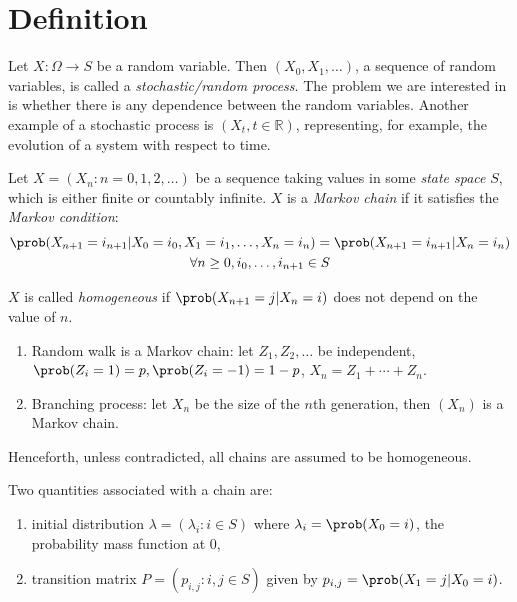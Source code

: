 \documentclass[a4paper]{article}
\begin{document}


\tableofcontents

\section{Definition}

Let $X:\Omega \to S$ be a random variable. Then $(X_0,X_1, \ldots)$, a sequence of random variables, is called a \emph{stochastic/random process}. The problem we are interested in is whether there is any dependence between the random variables. Another example of a stochastic process is $(X_t, t \in \mathbb{R})$, representing, for example, the evolution of a system with respect to time.

\begin{definition}
  Let $X=(X_n:n=0,1,2,\ldots)$ be a sequence taking values in some \emph{state space} $S$, which is either finite or countably infinite. $X$ is a \emph{Markov chain} if it satisfies the \emph{Markov condition}:
  \begin{multline*}
    \prob(X_{n+1}=i_{n+1}|X_0=i_0,X_1=i_1,\ldots,X_n=i_n) = \prob(X_{n+1}=i_{n+1}|X_n=i_n) \\
    \forall n\geq0, i_0,\ldots,i_{n+1}\in S
  \end{multline*}

  $X$ is called \emph{homogeneous} if $\prob(X_{n+1}=j|X_n=i)$ does not depend on the value of $n$.
\end{definition}

\begin{eg}\leavevmode
  \begin{enumerate}
  \item Random walk is a Markov chain: let $Z_1, Z_2, \ldots$ be independent, $\prob(Z_i=1) = p,\prob(Z_i=-1) =1-p$, $X_n=Z_1+\cdots+Z_n$.
  \item Branching process: let $X_n$ be the size of the $n$th generation, then $(X_n)$ is a Markov chain.
  \end{enumerate}
\end{eg}

\begin{convention}
  Henceforth, unless contradicted, all chains are assumed to be homogeneous.
\end{convention}

Two quantities associated with a chain are:
\begin{enumerate}
\item initial distribution $\lambda = (\lambda_i: i\in S)$ where $\lambda_i = \prob(X_0=i)$, the probability mass function at $0$,
\item transition matrix $P = (p_{i,j}: i,j\in S)$ given by $p_{i,j} = \prob(X_1=j|X_0=i)$.
\end{enumerate}
\end{document}
